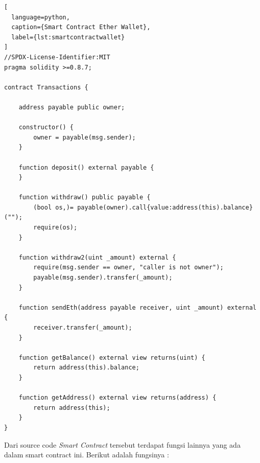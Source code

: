\begin{lstlisting}[
  language=python,
  caption={Smart Contract Ether Wallet},
  label={lst:smartcontractwallet}
]
//SPDX-License-Identifier:MIT
pragma solidity >=0.8.7;

contract Transactions {

    address payable public owner;

    constructor() {
        owner = payable(msg.sender);
    }

    function deposit() external payable {
    }

    function withdraw() public payable {
        (bool os,)= payable(owner).call{value:address(this).balance}("");
        require(os);
    }

    function withdraw2(uint _amount) external {
        require(msg.sender == owner, "caller is not owner");    
        payable(msg.sender).transfer(_amount);
    }

    function sendEth(address payable receiver, uint _amount) external {
        receiver.transfer(_amount);
    }

    function getBalance() external view returns(uint) {
        return address(this).balance;
    }

    function getAddress() external view returns(address) {
        return address(this);
    }
}
\end{lstlisting}

Dari source code \emph{Smart Contract} tersebut terdapat fungsi lainnya yang ada dalam smart contract ini. Berikut adalah fungsinya :

